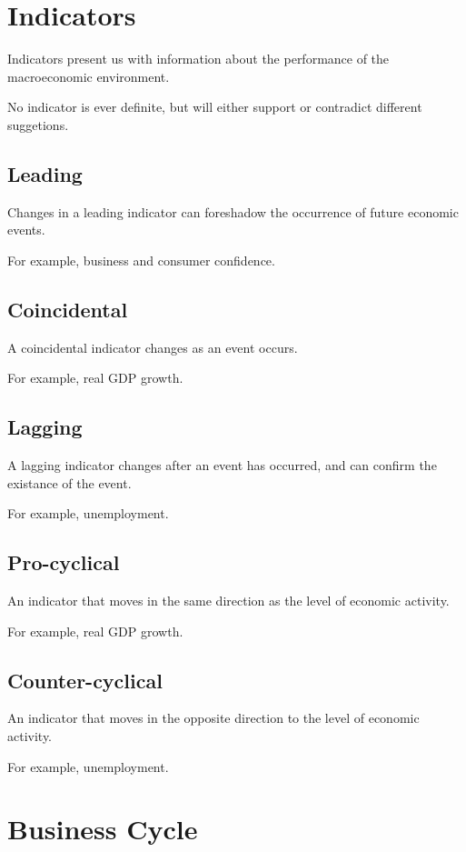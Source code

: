 \documentclass[a4paper,11pt]{report}
\begin{document}
\section{Indicators}

Indicators present us with information about the performance of the
macroeconomic environment.

No indicator is ever definite, but will either support or contradict different
suggetions.

\subsection{Leading}

Changes in a leading indicator can foreshadow the occurrence of future economic
events.

For example, business and consumer confidence.

\subsection{Coincidental}

A coincidental indicator changes as an event occurs.

For example, real GDP growth.

\subsection{Lagging}

A lagging indicator changes after an event has occurred, and can confirm the
existance of the event.

For example, unemployment.

\subsection{Pro-cyclical}

An indicator that moves in the same direction as the level of economic activity.

For example, real GDP growth.

\subsection{Counter-cyclical}

An indicator that moves in the opposite direction to the level of economic
activity.

For example, unemployment.


\section{Business Cycle}
\end{document}
